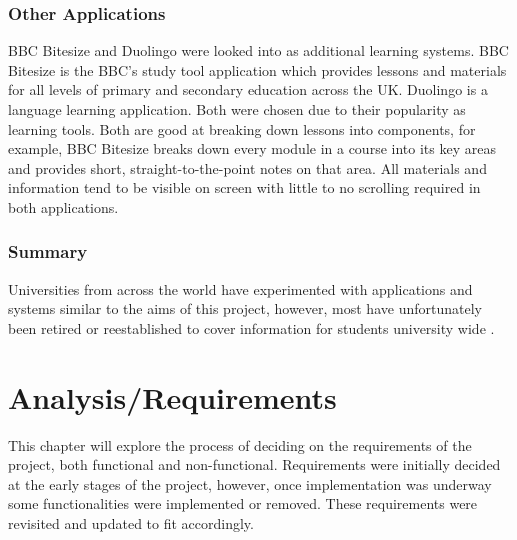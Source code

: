 \documentclass{l4proj}
\begin{document}
\subsection{Other Applications}
BBC Bitesize and Duolingo were looked into as additional learning systems. BBC Bitesize is the BBC's study tool application which provides lessons and materials for all levels of primary and secondary education across the UK. Duolingo is a language learning application. Both were chosen due to their popularity as learning tools. Both are good at breaking down lessons into components,  for example,   BBC Bitesize breaks down every module in a course into its key areas and provides short,  straight-to-the-point notes on that area. All materials and information tend to be visible on screen with little to no scrolling required in both applications.

\subsection{Summary}
Universities from across the world have experimented with applications and systems similar to the aims of this project,  however,  most have unfortunately been retired or reestablished to cover information for students university wide .

\chapter{Analysis/Requirements} \label{Requierments}

This chapter will explore the process of deciding on the requirements of the project,  both functional and non-functional. Requirements were initially decided at the early stages of the project,  however,  once implementation was underway some functionalities were implemented or removed. These requirements were revisited and updated to fit accordingly.
\end{document}
